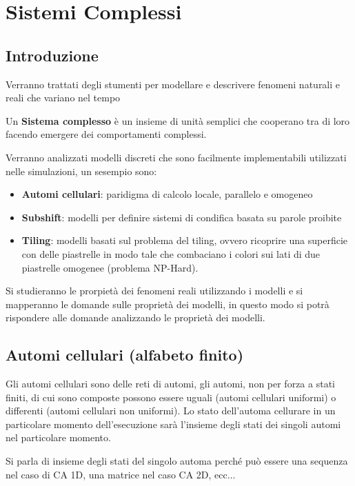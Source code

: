 \chapter{Sistemi Complessi}
\section{Introduzione}
Verranno trattati degli stumenti per modellare e descrivere fenomeni naturali e reali
che variano nel tempo
\begin{definizione}
    Un \textbf{Sistema complesso} è un insieme di unità semplici che cooperano tra
    di loro facendo emergere dei comportamenti complessi.
\end{definizione}
Verranno analizzati modelli discreti che sono facilmente implementabili utilizzati
nelle simulazioni, un sesempio sono:
\begin{itemize}
    \item \textbf{Automi cellulari}: paridigma di calcolo locale, parallelo e omogeneo
    \item \textbf{Subshift}: modelli per definire sistemi di condifica basata su
          parole proibite
    \item \textbf{Tiling}: modelli basati sul problema del tiling, ovvero ricoprire
          una superficie con delle piastrelle in modo tale che combaciano i colori sui
          lati di due piastrelle omogenee (problema NP-Hard).
\end{itemize}

Si studieranno le prorpietà dei fenomeni reali utilizzando i modelli e si mapperanno
le domande sulle proprietà dei modelli, in questo modo si potrà rispondere alle
domande analizzando le proprietà dei modelli.



\section{Automi cellulari (alfabeto finito)}
Gli automi cellulari sono delle reti di automi, gli automi, non per forza a stati
finiti, di cui sono composte possono essere uguali (automi cellulari uniformi) o differenti (automi cellulari non
uniformi). Lo stato dell'automa cellurare in un particolare momento dell'esecuzione
sarà l'insieme degli stati dei singoli automi nel particolare momento.

\begin{nota}
    Si parla di insieme degli stati del singolo automa perché può essere una
    sequenza nel caso di CA 1D, una matrice nel caso CA 2D, ecc$\dots$
\end{nota}

